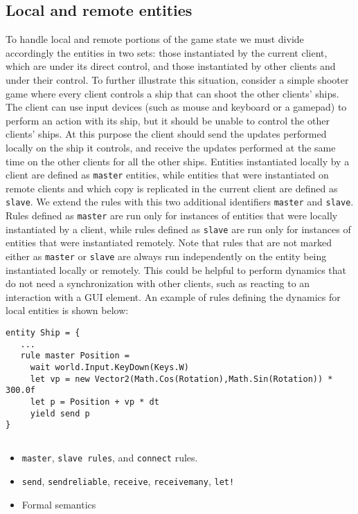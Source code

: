 \subsection{Local and remote entities}
To handle local and remote portions of the game state we must divide accordingly the entities in two sets: those instantiated by the current client, which are under its direct control, and those instantiated by other clients and under their control. To further illustrate this situation, consider a simple shooter game where every client controls a ship that can shoot the other clients' ships. The client can use input devices (such as mouse and keyboard or a gamepad) to perform an action with its ship, but it should be unable to control the other clients' ships. At this purpose the client should send the updates performed locally on the ship it controls, and receive the updates performed at the same time on the other clients for all the other ships. Entities instantiated locally by a client are defined as \texttt{master} entities, while entities that were instantiated on remote clients and which copy is replicated in the current client are defined as \texttt{slave}. We extend the rules with this two additional identifiers \texttt{master} and \texttt{slave}. Rules defined as \texttt{master} are run only for instances of entities that were locally instantiated by a client, while rules defined as \texttt{slave} are run only for instances of entities that were instantiated remotely. Note that rules that are not marked either as \texttt{master} or \texttt{slave} are always run independently on the entity being instantiated locally or remotely. This could be helpful to perform dynamics that do not need a synchronization with other clients, such as reacting to an interaction with a GUI element. An example of rules defining the dynamics for local entities is shown below:

\begin{lstlisting}
entity Ship = {
   ...
   rule master Position =
     wait world.Input.KeyDown(Keys.W)
     let vp = new Vector2(Math.Cos(Rotation),Math.Sin(Rotation)) * 300.0f
     let p = Position + vp * dt
     yield send p     
}
\end{lstlisting}

\subsection{}

\begin{itemize}[noitemsep]
	\item \texttt{master}, \texttt{slave rules}, and \texttt{connect} rules.
	\item \texttt{send}, \texttt{send\textunderscore reliable}, \texttt{receive}, \texttt{receive\textunderscore many}, \texttt{let!}
	\item Formal semantics
\end{itemize}